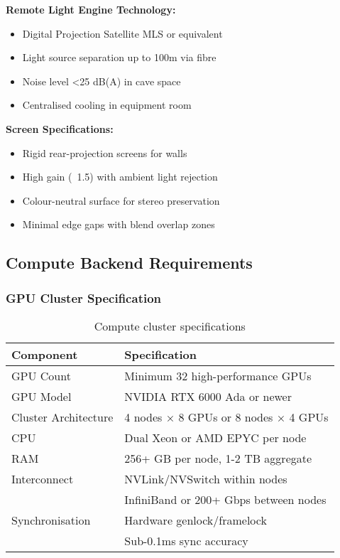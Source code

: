 \textbf{Remote Light Engine Technology:}
\begin{itemize}
    \item Digital Projection Satellite MLS or equivalent
    \item Light source separation up to 100m via fibre
    \item Noise level <25 dB(A) in cave space
    \item Centralised cooling in equipment room
\end{itemize}

\textbf{Screen Specifications:}
\begin{itemize}
    \item Rigid rear-projection screens for walls
    \item High gain (~1.5) with ambient light rejection
    \item Colour-neutral surface for stereo preservation
    \item Minimal edge gaps with blend overlap zones
\end{itemize}

\subsection{Compute Backend Requirements}

\subsubsection{GPU Cluster Specification}

\begin{table}[h]
\centering
\begin{tabular}{|l|l|}
\hline
\textbf{Component} & \textbf{Specification} \\
\hline
GPU Count & Minimum 32 high-performance GPUs \\
\hline
GPU Model & NVIDIA RTX 6000 Ada or newer \\
\hline
Cluster Architecture & 4 nodes × 8 GPUs or 8 nodes × 4 GPUs \\
\hline
CPU & Dual Xeon or AMD EPYC per node \\
\hline
RAM & 256+ GB per node, 1-2 TB aggregate \\
\hline
Interconnect & NVLink/NVSwitch within nodes \\
 & InfiniBand or 200+ Gbps between nodes \\
\hline
Synchronisation & Hardware genlock/framelock \\
 & Sub-0.1ms sync accuracy \\
\hline
\end{tabular}
\caption{Compute cluster specifications}
\end{table}

